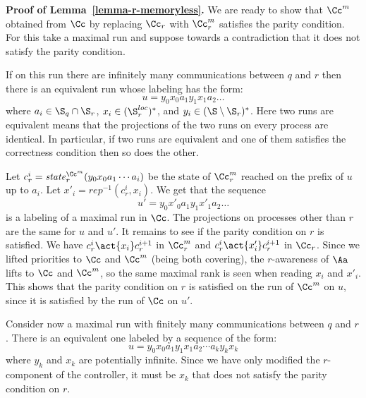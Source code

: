 \documentclass[10pt,a4paper]{article}
\newcommand{\rep}{\mathit{rep}}
\newcommand{\mem}[1]{#1^m}
\newcommand{\state}{\mathit{state}}
\begin{document}
\medskip

\textbf{Proof of Lemma~\ref{lemma-r-memoryless}.}
  We are ready to show that $\mem\Cc$ obtained from $\Cc$ by replacing $\Cc_r$
  with $\mem\Cc_r$ satisfies the parity condition. For this take a
  maximal run and suppose towards a contradiction
  that it does not satisfy the parity condition.

  If on this run there are infinitely many communications between $q$ and $r$ 
  then there is an equivalent run whose labeling has the form:
  \begin{equation}u=y_0x_0a_1y_1x_1a_2\dots
  \end{equation}
  where $a_i\in \S_q \cap \S_r$, $x_i\in (\S^{loc}_r)^*$, and $y_i\in
  (\S\setminus\S_r)^*$. Here two runs are equivalent means that the
  projections of the two runs on every process are identical. In
  particular, if two runs are equivalent and one of them satisfies the
  correctness condition then so does the other. 

  Let $c^i_r=\state_r^{\mem\Cc}(y_0x_0a_1\cdots a_i)$ be the state of
  $\mem\Cc_r$ reached on the prefix of $u$ up to $a_i$. Let
  $x'_i=\rep^{-1}(c^i_r,x_i)$. We get that the sequence
  \begin{equation}u'=y_0x'_0a_1y_1x'_1a_2\dots
  \end{equation}
  is a labeling of a maximal run in $\Cc$. The projections on processes other than $r$ are
  the same for $u$ and $u'$. It remains to see if the parity condition
  on $r$ is satisfied. We have $c_r^i \act{x_i} c_r^{i+1}$ in
  $\mem\Cc_r$ and $c_r^i \act{x'_i} c_r^{i+1}$ in $\Cc_r$. Since we
  lifted priorities to $\Cc$ and $\mem\Cc$ (being both covering),  the
  $r$-awareness of $\Aa$  lifts to $\Cc$ and $\mem\Cc$, so the
  same maximal rank is seen when reading $x_i$ and $x'_i$. This shows
  that the parity condition on $r$ is satisfied on the run of
  $\mem\Cc$ on $u$, since it is satisfied by the run of $\Cc$ on $u'$.


  Consider now a maximal run with finitely many communications between
  $q$ and $r$. There is an equivalent one labeled by a sequence of the
  form: 
  \begin{equation}u = y_0x_0a_1y_1x_1a_2\cdots a_ky_kx_k
  \end{equation}
  where $y_k$ and $x_k$ are potentially infinite. Since we have only
  modified the $r$-component of the controller, it must be $x_k$ that
  does not satisfy the parity condition on $r$. 
\end{document}
